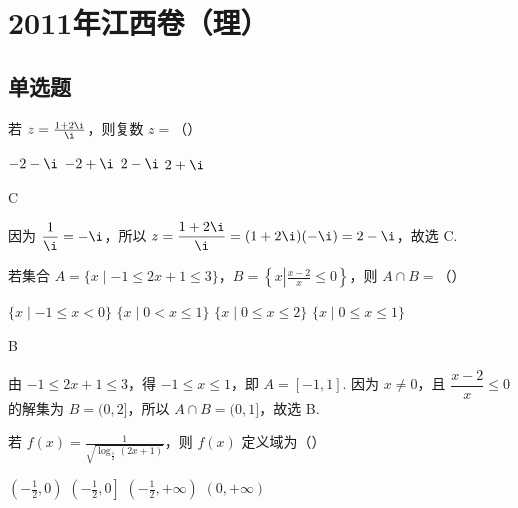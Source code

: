 \chapter{2011年江西卷（理）}

\section{单选题}

\begin{problem}
若 \(z = \frac{1 + 2\i}{\i}\)，则复数 \(z =\)（\quad）

\choices
    {\(-2 - \i\)}
    {\(-2 + \i\)}
    {\(2 - \i\)}
    {\(2 + \i\)}
\end{problem}

\begin{answer}
C
\end{answer}

\begin{solution}
因为 \(\dfrac{1}{\i}=-\i\)，所以
\(z=\dfrac{1+2\i}{\i}=(1+2\i)(-\i)=2-\i\)，故选 C.
\end{solution}

\begin{problem}
若集合 \(A = \{x \mid -1 \leqslant 2x + 1 \leqslant 3\}\)，\(B = \left\{x \left| \frac{x - 2}{x} \leqslant 0 \right.\right\}\)，则 \(A \cap B =\)（\quad）

\choices
    {\(\{x\mid -1\leqslant x < 0\}\)}
    {\(\{x\mid 0 < x\leqslant 1\}\)}
    {\(\{x\mid 0\leqslant x\leqslant 2\}\)}
    {\(\{x\mid 0\leqslant x\leqslant 1\}\)}
\end{problem}

\begin{answer}
B
\end{answer}

\begin{solution}
由 \(-1\leqslant 2x+1\leqslant 3\)，得 \(-1\leqslant x\leqslant 1\)，即
\(A=[-1,1]\). 因为 \(x\neq 0\)，且
\(\dfrac{x-2}{x}\leqslant 0\) 的解集为 \(B=(0,2]\)，所以
\(A\cap B=(0,1]\)，故选 B.
\end{solution}

\begin{problem}
若 \( f(x) = \frac{1}{\sqrt{\log_{\frac{1}{2}}(2x + 1)}} \)，则 \( f(x) \) 定义域为（\quad）

\choices
    {\(\left(-\frac{1}{2},0\right)\)}
    {\(\left(-\frac{1}{2},0\right]\)}
    {\(\left(-\frac{1}{2}, +\infty\right)\)}
    {\((0, +\infty)\)}
\end{problem}

